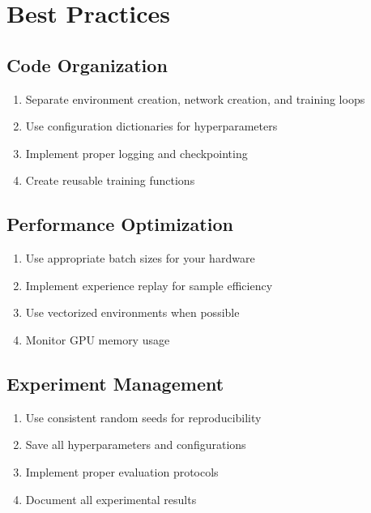 \section{Best Practices}

\subsection{Code Organization}

\begin{enumerate}
    \item Separate environment creation, network creation, and training loops
    \item Use configuration dictionaries for hyperparameters
    \item Implement proper logging and checkpointing
    \item Create reusable training functions
\end{enumerate}

\subsection{Performance Optimization}

\begin{enumerate}
    \item Use appropriate batch sizes for your hardware
    \item Implement experience replay for sample efficiency
    \item Use vectorized environments when possible
    \item Monitor GPU memory usage
\end{enumerate}

\subsection{Experiment Management}

\begin{enumerate}
    \item Use consistent random seeds for reproducibility
    \item Save all hyperparameters and configurations
    \item Implement proper evaluation protocols
    \item Document all experimental results
\end{enumerate} 